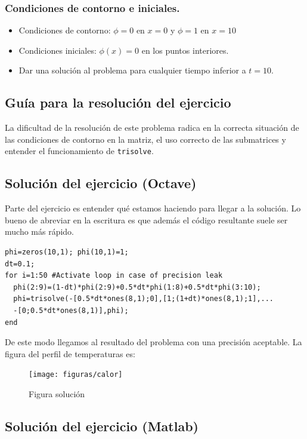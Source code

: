 \subsubsection*{Condiciones de contorno e iniciales.}

\begin{itemize}
\item Condiciones de contorno: $\phi=0$ en $x=0$ y $\phi=1$ en $x=10$ 
\item Condiciones iniciales: $\phi(x)=0$ en los puntos interiores.
\item Dar una solución al problema para cualquier tiempo inferior a $t=10$.
\end{itemize}

\subsection{Guía para la resolución del ejercicio}

La dificultad de la resolución de este problema radica en la correcta
situación de las condiciones de contorno en la matriz, el uso correcto
de las submatrices y entender el funcionamiento de \texttt{trisolve}.


\subsection{Solución del ejercicio (Octave)}

Parte del ejercicio es entender qué estamos haciendo para llegar a la
solución. Lo bueno de abreviar en la escritura es que además el código
resultante suele ser mucho más rápido.

\begin{verbatim}
phi=zeros(10,1); phi(10,1)=1;
dt=0.1;
for i=1:50 #Activate loop in case of precision leak
  phi(2:9)=(1-dt)*phi(2:9)+0.5*dt*phi(1:8)+0.5*dt*phi(3:10);
  phi=trisolve(-[0.5*dt*ones(8,1);0],[1;(1+dt)*ones(8,1);1],...
  -[0;0.5*dt*ones(8,1)],phi);
end
\end{verbatim}
De este modo llegamos al resultado del problema con una precisión
aceptable. La figura del perfil de temperaturas es:

%
\begin{figure}[H]
  \centering{} \texttt{[image: figuras/calor]}

  \caption{\label{cap:figcalor}Figura solución}
\end{figure}



\subsection{Solución del ejercicio (Matlab)}

